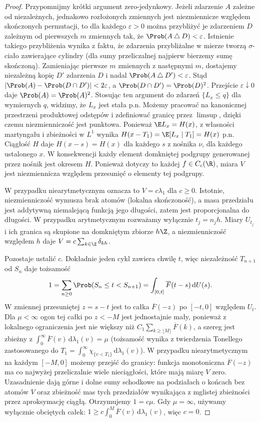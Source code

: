 \begin{proof}
Przypomnijmy krótki argument zero-jedynkowy.
Jeżeli zdarzenie $A$ zależne od niezależnych,
jednakowo rozłożonych zmiennych jest niezmiennicze
względem skończonych permutacji, to dla każdego
$\varepsilon>0$ można przybliżyć je zdarzeniem $D$
zależnym od pierwszych $m$ zmiennych tak, że
$\Prob(A\mathbin{\triangle}D)<\varepsilon$.
Istnienie takiego przybliżenia wynika z faktu,
że zdarzenia przybliżalne w mierze tworzą
$\sigma$-ciało zawierające cylindry (dla sumy
przeliczalnej najpierw bierzemy sumę skończoną).
Zamieniając pierwsze $m$ zmiennych z następnymi
$m$, dostajemy niezależną kopię $D'$ zdarzenia $D$
i nadal $\Prob(A\mathbin{\triangle}D')<\varepsilon$.
Stąd $|\Prob(A)-\Prob(D\cap D')|<2\varepsilon$,
a $\Prob(D\cap D')=\Prob(D)^2$.
Przejście $\varepsilon\downarrow0$ daje
$\Prob(A)=\Prob(A)^2$.
Stosując ten argument do zdarzeń
$\{L_x\le q\}$ dla wymiernych $q$, widzimy,
że $L_x$ jest stała p.n.
Możemy pracować na kanonicznej przestrzeni
produktowej odstępów i zdefiniować granicę
przez $\limsup$, dzięki czemu niezmienniczość
jest punktowa. Ponieważ $\E L_x=H(x)$,
z własności martyngału i zbieżności w $L^1$
wynika $H(x-T_1)=\E[L_x\mid T_1]=H(x)$ p.n.
Ciągłość $H$ daje $H(x-s)=H(x)$ dla każdego
$s$ z nośnika $\nu$, dla każdego ustalonego $x$.
W konsekwencji każdy element domkniętej
podgrupy generowanej przez nośnik jest okresem $H$.
Ponieważ dotyczy to każdej $f\in C_c(\R)$,
miara $V$ jest niezmiennicza względem przesunięć
o elementy tej podgrupy.

W przypadku niearytmetycznym oznacza to
$V=c\lambda_1$ dla $c\ge0$. Istotnie,
niezmienniczość wymusza brak atomów
(lokalna skończoność), a masa przedziału
jest addytywną niemalejącą funkcją jego długości,
zatem jest proporcjonalna do długości.
W przypadku arytmetycznym rozważamy wyłącznie
$t_j=n_jh$. Miary $U_{t_j}$ i ich granica
są skupione na domkniętym zbiorze $h\Z$,
a niezmienniczość względem $h$ daje
$V=c\sum_{k\in\Z}\delta_{kh}$.

Pozostaje ustalić $c$. Dokładnie jeden cykl
zawiera chwilę $t$, więc niezależność
$T_{n+1}$ od $S_n$ daje tożsamość
\[
1=\sum_{n\ge0}\Prob(S_n\le t<S_{n+1})
=\int_{[0,t]}\overline F(t-s)\,\mathrm dU(s).
\]
W zmiennej przesuniętej $z=s-t$ jest to
całka $\overline F(-z)$ po $[-t,0]$
względem $U_t$. Dla $\mu<\infty$
ogon tej całki po $z<-M$ jest jednostajnie
mały, ponieważ z lokalnego ograniczenia
jest nie większy niż
$C_1\sum_{k\ge\lfloor M\rfloor}\overline F(k)$,
a szereg jest zbieżny z
$\int_0^\infty\overline F(v)\,\mathrm d\lambda_1(v)=\mu$
(tożsamość wynika z twierdzenia Tonellego zastosowanego
do $T_1=\int_0^\infty\chi_{\{v<T_1\}}\,\mathrm d\lambda_1(v)$).
W przypadku niearytmetycznym na każdym
$[-M,0]$ możemy przejść do granicy:
funkcja monotoniczna $\overline F(-z)$ ma
co najwyżej przeliczalnie wiele nieciągłości,
które mają miarę $V$ zero. Uzasadnienie
dają górne i dolne sumy schodkowe na podziałach
o końcach bez atomów $V$ oraz zbieżność
mas tych przedziałów wynikająca z mglistej
zbieżności przez aproksymację ciągłą.
Otrzymujemy $1=c\mu$.
Gdy $\mu=\infty$, używamy wyłącznie obciętych
całek: $1\ge c\int_0^M\overline F(v)\,\mathrm d\lambda_1(v)$,
więc $c=0$.


\end{proof}
